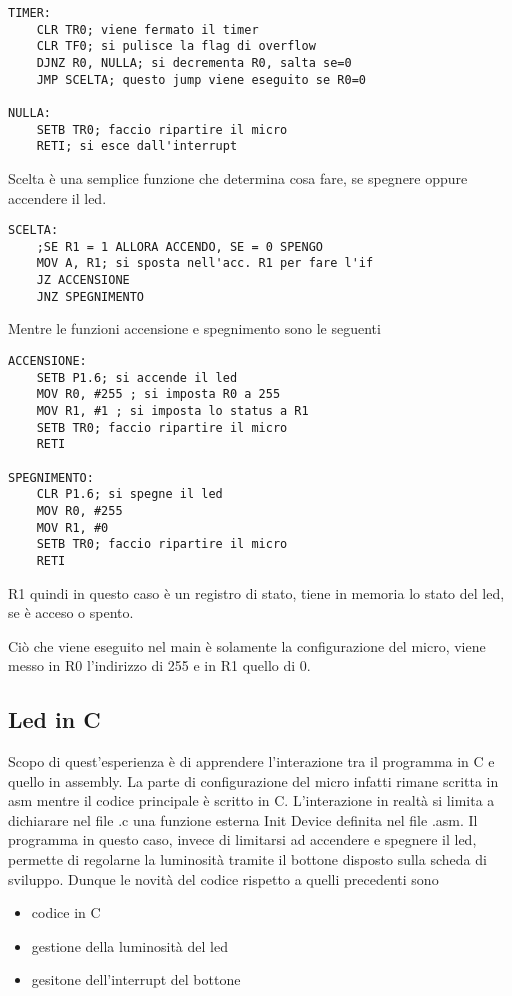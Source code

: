 \documentclass[main.tex]{subfiles}
\begin{document}
\begin{lstlisting}[caption=Funzione timer]
TIMER:
    CLR TR0; viene fermato il timer
    CLR TF0; si pulisce la flag di overflow
    DJNZ R0, NULLA; si decrementa R0, salta se=0
    JMP SCELTA; questo jump viene eseguito se R0=0

NULLA:
    SETB TR0; faccio ripartire il micro
    RETI; si esce dall'interrupt
\end{lstlisting}
 
 Scelta è una semplice funzione che determina cosa fare, se spegnere oppure accendere il led.
 \begin{lstlisting}[caption=Funzione scelta]
 SCELTA:
	;SE R1 = 1 ALLORA ACCENDO, SE = 0 SPENGO
	MOV A, R1; si sposta nell'acc. R1 per fare l'if
	JZ ACCENSIONE
	JNZ SPEGNIMENTO
 \end{lstlisting}

Mentre le funzioni accensione e spegnimento sono le seguenti
\begin{lstlisting}[caption=Funzioni accensione e spegnimento]
ACCENSIONE:
	SETB P1.6; si accende il led
	MOV R0, #255 ; si imposta R0 a 255
	MOV R1, #1 ; si imposta lo status a R1
	SETB TR0; faccio ripartire il micro
	RETI

SPEGNIMENTO:
	CLR P1.6; si spegne il led
	MOV R0, #255
	MOV R1, #0
	SETB TR0; faccio ripartire il micro
	RETI
\end{lstlisting}
R1 quindi in questo caso è un registro di stato, tiene in memoria lo stato del led, se è acceso o spento.

Ciò che viene eseguito nel main è solamente la configurazione del micro, viene messo in R0 l'indirizzo di 255 e in R1 quello di 0.

\subsection{Led in C}

Scopo di quest'esperienza è di apprendere l'interazione tra il programma in C e quello in assembly. La parte di configurazione del micro infatti rimane scritta in asm mentre il codice principale è scritto in C. L'interazione in realtà si limita a dichiarare nel file .c una funzione esterna Init Device definita nel file .asm. Il programma in questo caso, invece di limitarsi ad accendere e spegnere il led, permette di regolarne la luminosità tramite il bottone disposto sulla scheda di sviluppo. Dunque le novità del codice rispetto a quelli precedenti sono 
\begin{itemize}
    \item codice in C
    \item gestione della luminosità del led
    \item gesitone dell'interrupt del bottone
\end{itemize}
\end{document}
